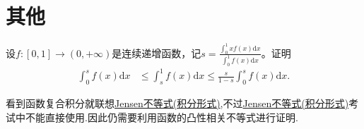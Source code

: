\documentclass[../../main.tex]{subfiles}
\begin{document}
\section{其他}

\begin{example}
设$f:[0,1]\to(0,+\infty)$是连续递增函数，记$s = \frac{\int_{0}^{1}xf(x)\mathrm{d}x}{\int_{0}^{1}f(x)\mathrm{d}x}$。证明
\begin{align*}
\int_{0}^{s}f(x)\mathrm{d}x&\leqslant\int_{s}^{1}f(x)\mathrm{d}x\leqslant\frac{s}{1 - s}\int_{0}^{s}f(x)\mathrm{d}x.
\end{align*}
\end{example}
\begin{note}
看到函数复合积分就联想\hyperref[theorem:Jensen不等式积分形式]{Jensen不等式(积分形式)},不过\hyperref[theorem:Jensen不等式积分形式]{Jensen不等式(积分形式)}考试中不能直接使用.因此仍需要利用函数的凸性相关不等式进行证明.
\end{note}
\end{document}
